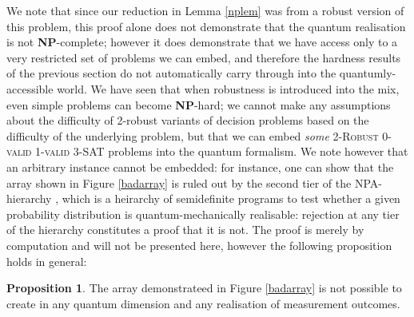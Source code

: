 \documentclass[reprint]{revtex4-1}
\theoremstyle{definition}
\newtheorem{prop}{Proposition}
\begin{document}
We note that since our reduction in Lemma \ref{nplem} was from a robust version of this problem, this proof alone does not demonstrate that the quantum realisation is not \textbf{NP}-complete; however it does demonstrate that we have access only to a very restricted set of problems we can embed, and therefore the hardness results of the previous section do not automatically carry through into the quantumly-accessible world. We have seen that when robustness is introduced into the mix, even simple problems can become \textbf{NP}-hard; we cannot make any assumptions about the difficulty of 2-robust variants of decision problems based on the difficulty of the underlying problem, but that we can embed \emph{some} \textsc{2-Robust 0-valid 1-valid 3-SAT} problems into the quantum formalism. We note however that an arbitrary instance cannot be embedded: for instance, one can show that the array shown in Figure \ref{badarray} is ruled out by the second tier of the NPA-hierarchy \cite{Nava2008}, which is a heirarchy of semidefinite programs to test whether a given probability distribution is quantum-mechanically realisable: rejection at any tier of the hierarchy constitutes a proof that it is not. The proof is merely by computation and will not be presented here, however the following proposition holds in general:

\begin{prop}The array demonstrateed in Figure \ref{badarray} is not possible to create in any quantum dimension and any realisation of measurement outcomes.
\end{prop}

\end{document}
